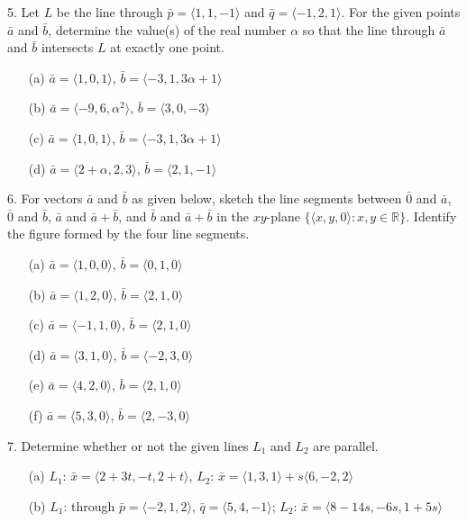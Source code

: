 \begin{exercisebox}
    
5. Let $L$ be the line through $\bar{p} = \langle 1, 1, -1 \rangle$ and $\bar{q} = \langle -1, 2, 1 \rangle$. For the given points $\bar{a}$ and $\bar{b}$, determine the value(s) of the real number $\alpha$ so that the line through $\bar{a}$ and $\bar{b}$ intersects $L$ at exactly one point.
\begin{itemize}
    \item[(a)] $\bar{a} = \langle 1, 0, 1 \rangle$, $\bar{b} = \langle -3, 1, 3\alpha + 1 \rangle$
    \item[(b)] $\bar{a} = \langle -9, 6, \alpha^2 \rangle$, $\bar{b} = \langle 3, 0, -3 \rangle$
    \item[(c)] $\bar{a} = \langle 1, 0, 1 \rangle$, $\bar{b} = \langle -3, 1, 3\alpha + 1 \rangle$
    \item[(d)] $\bar{a} = \langle 2 + \alpha, 2, 3 \rangle$, $\bar{b} = \langle 2, 1, -1 \rangle$
\end{itemize}

6. For vectors $\bar{a}$ and $\bar{b}$ as given below, sketch the line segments between $\bar{0}$ and $\bar{a}$, $\bar{0}$ and $\bar{b}$, $\bar{a}$ and $\bar{a} + \bar{b}$, and $\bar{b}$ and $\bar{a} + \bar{b}$ in the $xy$-plane $\{ \langle x, y, 0 \rangle : x, y \in \mathbb{R} \}$. Identify the figure formed by the four line segments.
\begin{multicols}{2}
\begin{itemize}
    \item[(a)] $\bar{a} = \langle 1, 0, 0 \rangle$, $\bar{b} = \langle 0, 1, 0 \rangle$
    \item[(b)] $\bar{a} = \langle 1, 2, 0 \rangle$, $\bar{b} = \langle 2, 1, 0 \rangle$
    \item[(c)] $\bar{a} = \langle -1, 1, 0 \rangle$, $\bar{b} = \langle 2, 1, 0 \rangle$
    \item[(d)] $\bar{a} = \langle 3, 1, 0 \rangle$, $\bar{b} = \langle -2, 3, 0 \rangle$
    \item[(e)] $\bar{a} = \langle 4, 2, 0 \rangle$, $\bar{b} = \langle 2, 1, 0 \rangle$
    \item[(f)] $\bar{a} = \langle 5, 3, 0 \rangle$, $\bar{b} = \langle 2, -3, 0 \rangle$
\end{itemize}
\end{multicols}

7. Determine whether or not the given lines $L_1$ and $L_2$ are parallel.
\begin{itemize}
    \item[(a)] $L_1$: $\bar{x} = \langle 2 + 3t, -t, 2 + t \rangle$, $L_2$: $\bar{x} = \langle 1, 3, 1 \rangle + s\langle 6, -2, 2 \rangle$
    \item[(b)] $L_1$: through $\bar{p} = \langle -2, 1, 2 \rangle$, $\bar{q} = \langle 5, 4, -1 \rangle$; 
              $L_2$: $\bar{x} = \langle 8 - 14s, -6s, 1 + 5s \rangle$
\end{itemize}


\end{exercisebox}
